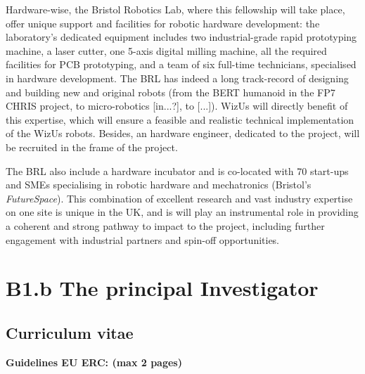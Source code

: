 \documentclass[11pt]{article}
\newcommand{\project}{WizUs\xspace}
\newcommand{\eu}[1]{{\color{teal}\textbf{Guidelines EU ERC: #1}}}
\begin{document}
Hardware-wise, the Bristol Robotics Lab, where this fellowship will take place,
offer unique support and facilities for robotic hardware development: the
laboratory's dedicated equipment includes two industrial-grade rapid prototyping
machine, a laser cutter, one 5-axis digital milling machine, all the required
facilities for PCB prototyping, and a team of six full-time technicians,
specialised in hardware development. The BRL has indeed a long track-record of
designing and building new and original robots (from the BERT humanoid in the
FP7 CHRIS project, to micro-robotics [in...?], to [...]). \project will directly
benefit of this expertise, which will ensure a feasible and realistic technical
implementation of the \project robots. Besides, an hardware engineer, dedicated
to the project, will be recruited in the frame of the project.

The BRL also include a hardware incubator and is co-located with 70 start-ups
and SMEs specialising in robotic hardware and mechatronics (Bristol's
\emph{FutureSpace}). This combination of excellent research and vast industry
expertise on one site is unique in the UK, and is will play an instrumental role
in providing a coherent and strong pathway to impact to the project, including
further engagement with industrial partners and spin-off opportunities.



\newpage

\printbibliography





\newpage

\section{B1.b The principal Investigator}\label{the-principal-investigator}

\hypertarget{curriculum-vitae}{%
\subsection{Curriculum vitae}\label{curriculum-vitae}}

\eu{(max 2 pages)}

\newpage
\end{document}
